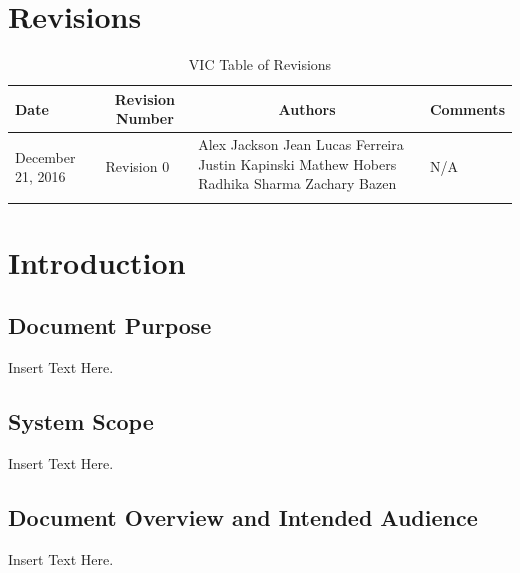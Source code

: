 \documentclass [11pt]{article}
\begin{document}
\section{Revisions}
\begin{longtable}{| p{ } | p{ } | p{ } | p{ } |}

\hline 
\centering \textbf{Date} & 
\multicolumn{1}{c}{\textbf {Revision Number}} &
\multicolumn{1}{|c}{\textbf {Authors}} & 
\multicolumn{1}{|c|}{\textbf {Comments}} \\ \hline

\multirow{4}{*}{\centering December 21, 2016}  & 
\multirow{4}{*}{Revision 0}& 
{Alex Jackson \newline
Jean Lucas Ferreira \newline
Justin Kapinski\newline
Mathew Hobers\newline
Radhika Sharma\newline
Zachary Bazen}
&
 \multirow{4}{*}{N/A} \\ 
\hline 

\caption{VIC Table of Revisions} 
\end{longtable}
\pagebreak


\section {Introduction}

\subsection{Document Purpose}
Insert Text Here.

\subsection{System Scope}
Insert Text Here. 

\subsection{Document Overview and Intended Audience}
Insert Text Here. 
\end{document}
